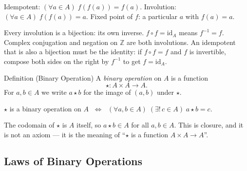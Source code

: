 \begin{remark}
Idempotent: $(\forall a \in A)\; f(f(a)) = f(a)$.
\quad
Involution: $(\forall a \in A)\; f(f(a)) = a$.
\quad
Fixed point of $f$: a particular $a$ with $f(a) = a$.
\end{remark}

\begin{remark}
Every involution is a bijection: its own inverse.
$f \circ f = \mathrm{id}_A$ means $f^{-1} = f$.
Complex conjugation and negation on $\mathbb{Z}$ are both involutions.
An idempotent that is also a bijection must be the identity:
if $f \circ f = f$ and $f$ is invertible, compose both sides on the right
by $f^{-1}$ to get $f = \mathrm{id}_A$.
\end{remark}


\begin{definitionbox}{Definition (Binary Operation)}
\label{def:binary-op}
A \emph{binary operation} on $A$ is a function
\[
  \star : A \times A \to A.
\]
For $a, b \in A$ we write $a \star b$ for the image of $(a, b)$ under
$\star$.
\end{definitionbox}

\begin{remark}
$\star$ is a binary operation on $A$
$\;\iff\;$
$(\forall a, b \in A)\;(\exists!\, c \in A)\; a \star b = c$.
\end{remark}

\begin{remark}
The codomain of $\star$ is $A$ itself, so $a \star b \in A$ for all
$a, b \in A$.
This is closure, and it is not an axiom — it is the meaning of
``$\star$ is a function $A \times A \to A$''.
\end{remark}


\subsection*{Laws of Binary Operations}

